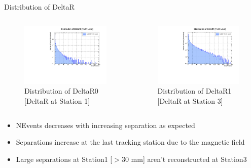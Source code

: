 \begin{frame}{Distribution of DeltaR}
	\begin{columns}
		\begin{column}{0.5\linewidth}
			\begin{figure}
				\includegraphics[width=\linewidth]{./output/DeltaR0.pdf}
				\caption{\tiny Distribution of DeltaR0 [DeltaR at Station 1]}
			\end{figure}
		\end{column}
		\begin{column}{0.5\linewidth}
			\begin{figure}
				\includegraphics[width=\linewidth]{./output/DeltaR1.pdf}
				\caption{\tiny Distribution of DeltaR1 [DeltaR at Station 3]}
			\end{figure}
		\end{column}
	\end{columns}
	\vspace{0.5cm}
	\begin{itemize}
		\scriptsize
		\item NEvents decreases with increasing separation as expected
		\item Separations increase at the last tracking station due to the magnetic field
		\item Large separations at Station1 [$>$30 mm] aren't reconstructed at Station3
	\end{itemize}
\end{frame}

